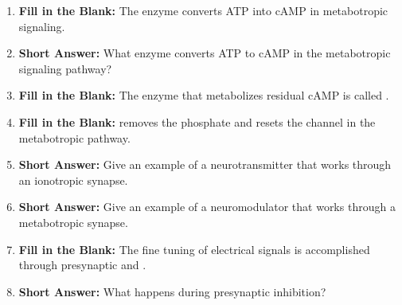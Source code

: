 \begin{enumerate}[label=\textbf{Q2.5.\arabic*}]
      \item \textbf{Fill in the Blank:} The enzyme \underline{\hspace{3cm}} converts ATP into cAMP in metabotropic signaling. \\

      \item \textbf{Short Answer:} What enzyme converts ATP to cAMP in the metabotropic signaling pathway? \\

      \item \textbf{Fill in the Blank:} The enzyme that metabolizes residual cAMP is called \underline{\hspace{3cm}}. \\
            
      \item \textbf{Fill in the Blank:} \underline{\hspace{3cm}} removes the phosphate and resets the channel in the metabotropic pathway. \\
            
      \item \textbf{Short Answer:} Give an example of a neurotransmitter that works through an ionotropic synapse. \\
            
      \item \textbf{Short Answer:} Give an example of a neuromodulator that works through a metabotropic synapse. \\

      \item \textbf{Fill in the Blank:} The fine tuning of electrical signals is accomplished through presynaptic \underline{\hspace{3cm}} and \underline{\hspace{3cm}}. \\
            
      \item \textbf{Short Answer:} What happens during presynaptic inhibition? \\
\newpage
      

\end{enumerate}
